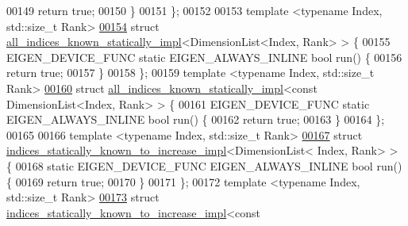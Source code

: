 \begin{DoxyCode}
00149     \textcolor{keywordflow}{return} \textcolor{keyword}{true};
00150   \}
00151 \};
00152 
00153 \textcolor{keyword}{template} <\textcolor{keyword}{typename} Index, std::\textcolor{keywordtype}{size\_t} Rank>
\hyperlink{struct_eigen_1_1internal_1_1all__indices__known__statically__impl_3_01_dimension_list_3_01_index_00_01_rank_01_4_01_4}{00154} \textcolor{keyword}{struct }\hyperlink{struct_eigen_1_1internal_1_1all__indices__known__statically__impl}{all\_indices\_known\_statically\_impl}<DimensionList<Index, Rank> > \{
00155   EIGEN\_DEVICE\_FUNC \textcolor{keyword}{static} EIGEN\_ALWAYS\_INLINE \textcolor{keywordtype}{bool} run() \{
00156     \textcolor{keywordflow}{return} \textcolor{keyword}{true};
00157   \}
00158 \};
00159 \textcolor{keyword}{template} <\textcolor{keyword}{typename} Index, std::\textcolor{keywordtype}{size\_t} Rank>
\hyperlink{struct_eigen_1_1internal_1_1all__indices__known__statically__impl_3_01const_01_dimension_list_3_01_index_00_01_rank_01_4_01_4}{00160} \textcolor{keyword}{struct }\hyperlink{struct_eigen_1_1internal_1_1all__indices__known__statically__impl}{all\_indices\_known\_statically\_impl}<const DimensionList<Index, Rank> 
      > \{
00161   EIGEN\_DEVICE\_FUNC \textcolor{keyword}{static} EIGEN\_ALWAYS\_INLINE \textcolor{keywordtype}{bool} run() \{
00162     \textcolor{keywordflow}{return} \textcolor{keyword}{true};
00163   \}
00164 \};
00165 
00166 \textcolor{keyword}{template} <\textcolor{keyword}{typename} Index, std::\textcolor{keywordtype}{size\_t} Rank>
\hyperlink{struct_eigen_1_1internal_1_1indices__statically__known__to__increase__impl_3_01_dimension_list_3_01_index_00_01_rank_01_4_01_4}{00167} \textcolor{keyword}{struct }\hyperlink{struct_eigen_1_1internal_1_1indices__statically__known__to__increase__impl}{indices\_statically\_known\_to\_increase\_impl}<DimensionList<
      Index, Rank> > \{
00168   \textcolor{keyword}{static} EIGEN\_DEVICE\_FUNC EIGEN\_ALWAYS\_INLINE \textcolor{keywordtype}{bool} run() \{
00169     \textcolor{keywordflow}{return} \textcolor{keyword}{true};
00170   \}
00171 \};
00172 \textcolor{keyword}{template} <\textcolor{keyword}{typename} Index, std::\textcolor{keywordtype}{size\_t} Rank>
\hyperlink{struct_eigen_1_1internal_1_1indices__statically__known__to__increase__impl_3_01const_01_dimensio6db8c53663683fc03a6211a2a9a1ff02}{00173} \textcolor{keyword}{struct }\hyperlink{struct_eigen_1_1internal_1_1indices__statically__known__to__increase__impl}{indices\_statically\_known\_to\_increase\_impl}<const 

\end{DoxyCode}
